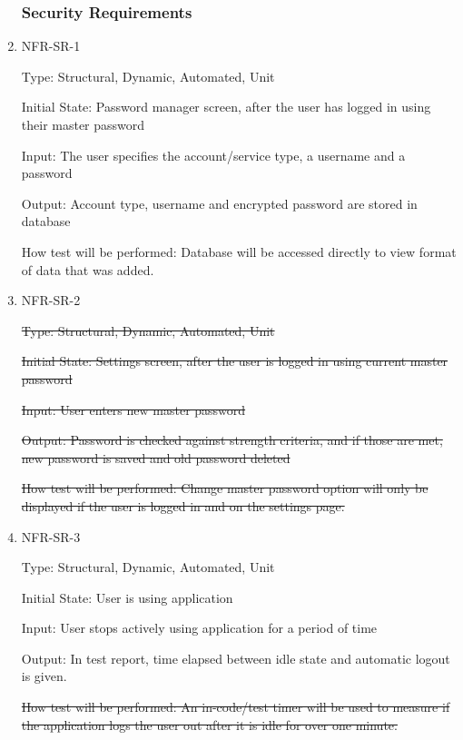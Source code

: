 \documentclass[12pt, titlepage]{article}
\begin{document}
\begin{enumerate}
\subsubsection{Security Requirements}

\item{NFR-SR-1\\}

Type: Structural, Dynamic, Automated, Unit

Initial State: Password manager screen, after the user has logged in using their master password

Input: The user specifies the account/service type, a username and a password

Output: Account type, username and encrypted password are stored in database

How test will be performed: Database will be accessed directly to view format of data that was added.
 
\item{NFR-SR-2}

\sout{Type: Structural, Dynamic, Automated, Unit}

\sout{Initial State: Settings screen, after the user is logged in using current master password}

\sout{Input: User enters new master password}

\sout{Output: Password is checked against strength criteria, and if those are met, new password is saved and old password deleted}

\sout{How test will be performed: Change master password option will only be displayed if the user is logged in and on the settings page.}

\item{NFR-SR-3}

Type: Structural, Dynamic, Automated, Unit

Initial State: User is using application

Input: User stops actively using application for a period of time

Output: In test report, time elapsed between idle state and automatic logout is given.

\sout{How test will be performed: An in-code/test timer will be used to measure if the application logs the user out after it is idle for over one minute.}

\end{enumerate}
\end{document}

